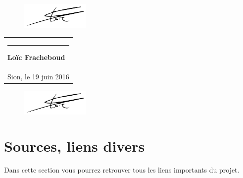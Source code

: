 \documentclass[a4paper,10pt]{article}
\newcommand{\signature}[2]{%
  \par\nobreak\bigskip
  \begin{singlespace}%
  \mbox{}\hfill\begin{tabular}{p{8cm} }
      \rule{8cm}{0.5pt}\newline{}%
        \textbf{#1}\\%
       #2 %
  \end{tabular}%
  \end{singlespace}%
  \medskip%
 }
\begin{document}
 \begin{figure}
 \vspace{-52pt}
 \centering
 \includegraphics[scale=1]{signfracheboud}
 \end{figure}
 \signature{Loïc Fracheboud}{Sion, le 19 juin 2016} 
 
  \begin{figure}[!h]
 \centering
 \vspace{100pt}
 \includegraphics[scale=0.3]{images/signfracheboud}
 \end{figure}
 
 \pagebreak
 \section{Sources, liens divers}
 Dans cette section vous pourrez retrouver tous les liens importants du projet.
 
 
\end{document}
